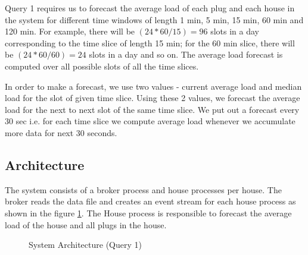 Query 1 requires us to forecast the average load of each plug and each house in the system for different time windows of length 1 min, 5 min, 15 min, 60 min and 120 min.
For example, there will be $(24*60/15) = 96$ slots in a day corresponding to the time slice of length 15 min; for the 60 min slice, there will be $(24*60/60) = 24$ slots in a day and so on.
The average load forecast is computed over all possible slots of all the time slices.

In order to make a forecast, we use two values - current average load and median load for the slot of given time slice.
Using these 2 values, we forecast the average load for the next to next slot of the same time slice.
We put out a forecast every 30 sec i.e.
for each time slice we compute average load whenever we accumulate more data for next 30 seconds.

\subsection{Architecture}
The system consists of a broker process and house processes per house.
The broker reads the data file and creates an event stream for each house process as shown in the figure \ref{fig:sysarch1}.
The House process is responsible to forecast the average load of the house and all plugs in the house.

\begin{figure}[h]
\begin{center}
\caption{System Architecture (Query 1)}
\end{center}
\label{fig:sysarch1}
\end{figure}

